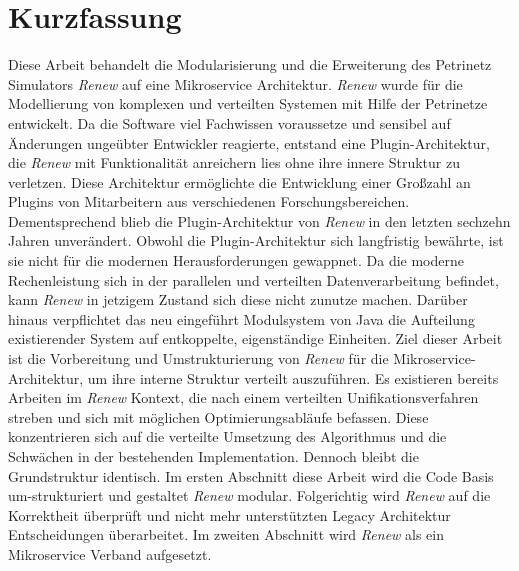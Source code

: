 




\newpage

\chapter*{Kurzfassung}
Diese Arbeit behandelt die Modularisierung und die Erweiterung des Petrinetz Simulators \textit{Renew} auf eine Mikroservice Architektur.
\newline
\textit{Renew} wurde für die Modellierung von komplexen und verteilten Systemen mit Hilfe der Petrinetze entwickelt. 
Da die Software viel Fachwissen voraussetze und sensibel auf Änderungen ungeübter Entwickler reagierte, entstand eine Plugin-Architektur, die \textit{Renew} mit Funktionalität anreichern lies ohne ihre innere Struktur zu verletzen. 
Diese Architektur ermöglichte die Entwicklung einer Großzahl an Plugins von Mitarbeitern aus verschiedenen Forschungsbereichen.
Dementsprechend blieb die Plugin-Architektur von \textit{Renew} in den letzten sechzehn Jahren unverändert.     
\bigbreak
Obwohl die Plugin-Architektur sich langfristig bewährte, ist sie nicht für die modernen Herausforderungen gewappnet. 
Da die moderne Rechenleistung sich in der parallelen und verteilten Datenverarbeitung befindet, kann \textit{Renew} in jetzigem Zustand sich diese nicht zunutze machen. 
Darüber hinaus verpflichtet das neu eingeführt Modulsystem von Java die Aufteilung existierender System auf entkoppelte, eigenständige Einheiten.   
Ziel dieser Arbeit ist die Vorbereitung und Umstrukturierung von \textit{Renew} für die Mikroservice-Architektur, um ihre interne Struktur verteilt auszuführen. 
\bigbreak
Es existieren bereits Arbeiten im \textit{Renew} Kontext, die nach einem verteilten Unifikationsverfahren streben und sich mit möglichen Optimierungsabläufe befassen.
Diese konzentrieren sich auf die verteilte Umsetzung des Algorithmus und die Schwächen in der bestehenden Implementation. Dennoch bleibt die Grundstruktur identisch.
\bigbreak
Im ersten Abschnitt diese Arbeit wird die Code Basis um-strukturiert und gestaltet \textit{Renew} modular. 
Folgerichtig wird \textit{Renew} auf die Korrektheit überprüft und nicht mehr unterstützten Legacy Architektur Entscheidungen überarbeitet. 
Im zweiten Abschnitt wird \textit{Renew} als ein Mikroservice Verband aufgesetzt.


